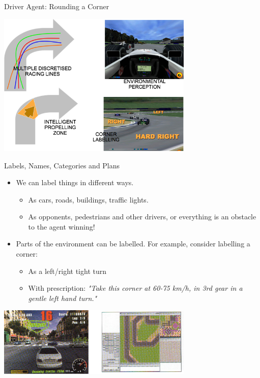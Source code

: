 \documentclass[aspectratio=1610,xcolor=dvipsnames,t]{beamer}
\begin{document}
\begin{frame}{Driver Agent: Rounding a Corner}
    \begin{center}
        \includegraphics[width=0.7\textwidth]{corner} 
    \end{center}
\end{frame} 

\begin{frame}{Labels, Names, Categories and Plans}
    \begin{itemize}
        \item We can label things in different ways.
            \begin{itemize}
                \item As cars, roads, buildings, traffic lights.
                \item As opponents, pedestrians and other drivers, 
                      or everything is an obstacle to the 
                      agent winning!
            \end{itemize}
        \item Parts of the environment can be labelled. 
              For example, consider labelling a corner:
              \begin{itemize}
                    \item As a left/right tight turn
                    \item With prescription: \emph{"Take this corner
                            at 60-75 km/h, in 3rd gear in a gentle
                        left hand turn."} 
              \end{itemize}
    \end{itemize}
    \begin{center}
        \includegraphics[width=0.7\textwidth]{corner2} 
    \end{center}
\end{frame} 
\end{document}

